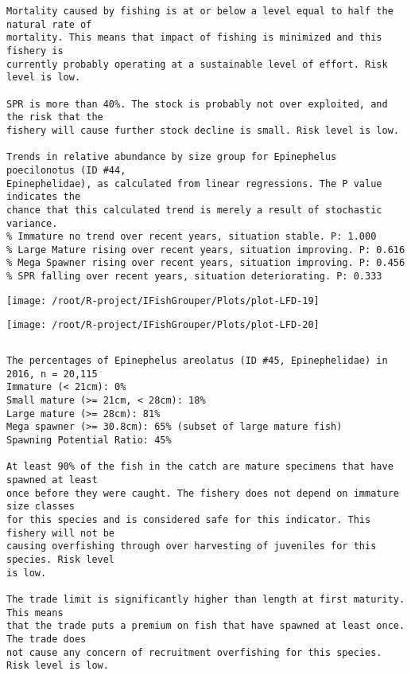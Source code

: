 \documentclass{report}\usepackage[]{graphicx}\usepackage[]{color}
\makeatletter
\def\maxwidth{ %
  \ifdim\Gin@nat@width>\linewidth
    \linewidth
  \else
    \Gin@nat@width
  \fi
}
\newenvironment{kframe}{%
 \def\at@end@of@kframe{}%
 \ifinner\ifhmode%
  \def\at@end@of@kframe{\end{minipage}}%
  \begin{minipage}{\columnwidth}%
 \fi\fi%
 \def\FrameCommand##1{\hskip\@totalleftmargin \hskip-\fboxsep
 \colorbox{shadecolor}{##1}\hskip-\fboxsep
     \hskip-\linewidth \hskip-\@totalleftmargin \hskip\columnwidth}%
 \MakeFramed {\advance\hsize-\width
   \@totalleftmargin\z@ \linewidth\hsize
   \@setminipage}}%
 {\par\unskip\endMakeFramed%
 \at@end@of@kframe}
\newenvironment{knitrout}{}{} %
\makeatother
\begin{document}
\begin{knitrout}
\begin{kframe}
\begin{verbatim}
Mortality caused by fishing is at or below a level equal to half the natural rate of
mortality. This means that impact of fishing is minimized and this fishery is
currently probably operating at a sustainable level of effort. Risk level is low.
 
SPR is more than 40%. The stock is probably not over exploited, and the risk that the
fishery will cause further stock decline is small. Risk level is low.
 
Trends in relative abundance by size group for Epinephelus poecilonotus (ID #44,
Epinephelidae), as calculated from linear regressions. The P value indicates the
chance that this calculated trend is merely a result of stochastic variance.
% Immature no trend over recent years, situation stable. P: 1.000
% Large Mature rising over recent years, situation improving. P: 0.616
% Mega Spawner rising over recent years, situation improving. P: 0.456
% SPR falling over recent years, situation deteriorating. P: 0.333
\end{verbatim}
\end{kframe}
\texttt{[image: /root/R-project/IFishGrouper/Plots/plot-LFD-19]} 

\texttt{[image: /root/R-project/IFishGrouper/Plots/plot-LFD-20]} 
\begin{kframe}\begin{verbatim}
\end{verbatim}
\end{kframe}
\clearpage
\newpage
\begin{kframe}\begin{verbatim}The percentages of Epinephelus areolatus (ID #45, Epinephelidae) in 2016, n = 20,115
Immature (< 21cm): 0%
Small mature (>= 21cm, < 28cm): 18%
Large mature (>= 28cm): 81%
Mega spawner (>= 30.8cm): 65% (subset of large mature fish)
Spawning Potential Ratio: 45%
 
At least 90% of the fish in the catch are mature specimens that have spawned at least
once before they were caught. The fishery does not depend on immature size classes
for this species and is considered safe for this indicator. This fishery will not be
causing overfishing through over harvesting of juveniles for this species. Risk level
is low.

The trade limit is significantly higher than length at first maturity.  This means
that the trade puts a premium on fish that have spawned at least once. The trade does
not cause any concern of recruitment overfishing for this species. Risk level is low.


\end{verbatim}
\end{kframe}
\end{knitrout}
\end{document}
